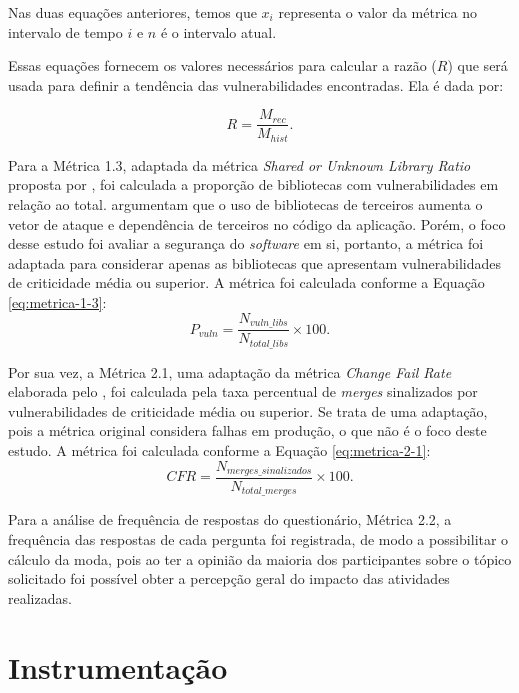 Nas duas equações anteriores, temos que $x_i$ representa o valor da métrica no intervalo de tempo $i$ e $n$ é o intervalo atual. 

Essas equações fornecem os valores necessários para calcular a razão ($R$) que será usada para definir a tendência das vulnerabilidades encontradas. Ela é dada por:

\begin{equation}
    R = \frac{M_{rec}}{M_{hist}}.
\end{equation}

Para a Métrica 1.3, adaptada da métrica \textit{Shared or Unknown Library Ratio} proposta por , foi calculada a proporção de bibliotecas com vulnerabilidades em relação ao total.  argumentam que o uso de bibliotecas de terceiros aumenta o vetor de ataque e dependência de terceiros no código da aplicação. Porém, o foco desse estudo foi avaliar a segurança do \textit{software} em si, portanto, a métrica foi adaptada para considerar apenas as bibliotecas que apresentam vulnerabilidades de criticidade média ou superior. A métrica foi calculada conforme a Equação \ref{eq:metrica-1-3}:
\begin{equation}
\label{eq:metrica-1-3}
    P_{vuln} = \frac{N_{vuln\_libs}}{N_{total\_libs}} \times 100.
\end{equation}

Por sua vez, a Métrica 2.1, uma adaptação da métrica \textit{Change Fail Rate} elaborada pelo , foi calculada pela taxa percentual de \textit{merges} sinalizados por vulnerabilidades de criticidade média ou superior. Se trata de uma adaptação, pois a métrica original considera falhas em produção, o que não é o foco deste estudo. A métrica foi calculada conforme a Equação \ref{eq:metrica-2-1}:
\begin{equation}
\label{eq:metrica-2-1}
    CFR = \frac{N_{merges\_sinalizados}}{N_{total\_merges}} \times 100.
\end{equation}

Para a análise de frequência de respostas do questionário, Métrica 2.2, a frequência das respostas de cada pergunta foi registrada, de modo a possibilitar o cálculo da moda, pois ao ter a opinião da maioria dos participantes sobre o tópico solicitado foi possível obter a percepção geral do impacto das atividades realizadas.

\section{Instrumentação}

